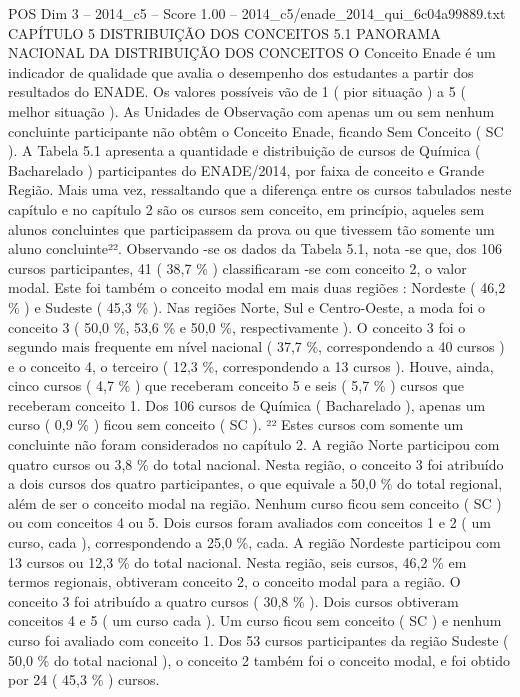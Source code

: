 \begin{textsample}{POS Dim 3 – 2014\_c5 – Score 1.00 – 2014\_c5/enade\_2014\_qui\_6c04a99889.txt}  \label{ex:f3_pos_220}
CAPÍTULO 5 DISTRIBUIÇÃO DOS CONCEITOS 5.1 PANORAMA NACIONAL DA DISTRIBUIÇÃO DOS CONCEITOS O Conceito Enade é um indicador de qualidade que avalia o desempenho dos estudantes a partir dos resultados do ENADE.
Os valores possíveis vão de 1 ( pior situação ) a 5 ( melhor situação ).
As Unidades de Observação com apenas um ou sem nenhum concluinte participante não obtêm o Conceito Enade, ficando Sem Conceito ( SC ).
A Tabela 5.1 apresenta a quantidade e distribuição de cursos de Química ( Bacharelado ) participantes do ENADE/2014, por faixa de conceito e Grande Região.
Mais uma vez, ressaltando que a diferença entre os cursos tabulados neste capítulo e no capítulo 2 são os cursos sem conceito, em princípio, aqueles sem alunos concluintes que participassem da prova ou que tivessem tão somente um aluno concluinte²².
Observando -se os dados da Tabela 5.1, nota -se que, dos 106 cursos participantes, 41 ( 38,7 \% ) classificaram -se com conceito 2, o valor modal.
Este foi também o conceito modal em mais duas regiões : Nordeste ( 46,2 \% ) e Sudeste ( 45,3 \% ).
Nas regiões Norte, Sul e Centro-Oeste, a moda foi o conceito 3 ( 50,0 \%, 53,6 \% e 50,0 \%, respectivamente ).
O conceito 3 foi o segundo mais frequente em nível nacional ( 37,7 \%, correspondendo a 40 cursos ) e o conceito 4, o terceiro ( 12,3 \%, correspondendo a 13 cursos ).
Houve, ainda, cinco cursos ( 4,7 \% ) que receberam conceito 5 e seis ( 5,7 \% ) cursos que receberam conceito 1.
Dos 106 cursos de Química ( Bacharelado ), apenas um curso ( 0,9 \% ) ficou sem conceito ( SC ). ²² Estes cursos com somente um concluinte não foram considerados no capítulo 2.
A região Norte participou com quatro cursos ou 3,8 \% do total nacional.
Nesta região, o conceito 3 foi atribuído a dois cursos dos quatro participantes, o que equivale a 50,0 \% do total regional, além de ser o conceito modal na região.
Nenhum curso ficou sem conceito ( SC ) ou com conceitos 4 ou 5.
Dois cursos foram avaliados com conceitos 1 e 2 ( um curso, cada ), correspondendo a 25,0 \%, cada.
A região Nordeste participou com 13 cursos ou 12,3 \% do total nacional.
Nesta região, seis cursos, 46,2 \% em termos regionais, obtiveram conceito 2, o conceito modal para a região.
O conceito 3 foi atribuído a quatro cursos ( 30,8 \% ).
Dois cursos obtiveram conceitos 4 e 5 ( um curso cada ).
Um curso ficou sem conceito ( SC ) e nenhum curso foi avaliado com conceito 1.
Dos 53 cursos participantes da região Sudeste ( 50,0 \% do total nacional ), o conceito 2 também foi o conceito modal, e foi obtido por 24 ( 45,3 \% ) cursos.

\end{textsample}

